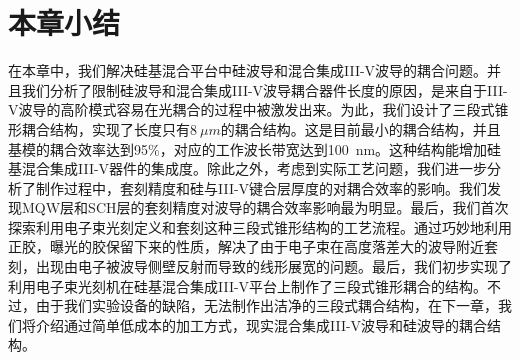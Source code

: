 \section{本章小结}
在本章中，我们解决硅基混合平台中硅波导和混合集成III-V波导的耦合问题。并且我们分析了限制硅波导和混合集成III-V波导耦合器件长度的原因，是来自于III-V波导的高阶模式容易在光耦合的过程中被激发出来。为此，我们设计了三段式锥形耦合结构，实现了长度只有$8 ~\mu m$的耦合结构。这是目前最小的耦合结构，并且基模的耦合效率达到95\%，对应的工作波长带宽达到100~nm。这种结构能增加硅基混合集成III-V器件的集成度。除此之外，考虑到实际工艺问题，我们进一步分析了制作过程中，套刻精度和硅与III-V键合层厚度的对耦合效率的影响。我们发现MQW层和SCH层的套刻精度对波导的耦合效率影响最为明显。最后，我们首次探索利用电子束光刻定义和套刻这种三段式锥形结构的工艺流程。通过巧妙地利用正胶，曝光的胶保留下来的性质，解决了由于电子束在高度落差大的波导附近套刻，出现由电子被波导侧壁反射而导致的线形展宽的问题。最后，我们初步实现了利用电子束光刻机在硅基混合集成III-V平台上制作了三段式锥形耦合的结构。不过，由于我们实验设备的缺陷，无法制作出洁净的三段式耦合结构，在下一章，我们将介绍通过简单低成本的加工方式，现实混合集成III-V波导和硅波导的耦合结构。